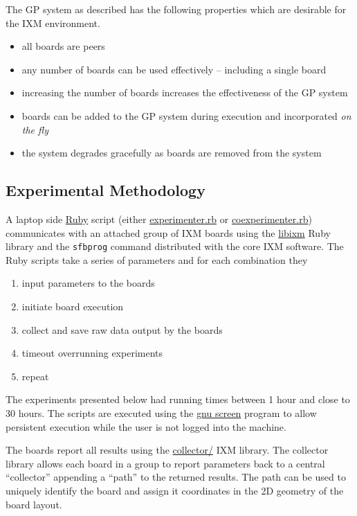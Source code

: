 \documentclass[11pt]{article}
\begin{document}
The GP system as described has the following properties which are
desirable for the IXM environment.
\begin{itemize}
\item all boards are peers
\item any number of boards can be used effectively -- including a single
  board
\item increasing the number of boards increases the effectiveness of the
  GP system
\item boards can be added to the GP system during execution and
  incorporated \emph{on the fly}
\item the system degrades gracefully as boards are removed from the system
\end{itemize}

\subsection*{Experimental Methodology}
\label{sec-1.4}

A laptop side \href{http://www.ruby-lang.org/en/}{Ruby} script (either \href{file:///nfs/adaptive/eschulte/src/gp4ixm-report/src/experimenter.rb}{experimenter.rb} or
\href{file:///nfs/adaptive/eschulte/src/gp4ixm-report/src/coexperimenter.rb}{coexperimenter.rb}) communicates with an attached group of IXM boards
using the \href{http://github.com/mixonic/libixm}{libixm} Ruby library and the \texttt{sfbprog} command distributed
with the core IXM software.  The Ruby scripts take a series of
parameters and for each combination they
\begin{enumerate}
\item input parameters to the boards
\item initiate board execution
\item collect and save raw data output by the boards
\item timeout overrunning experiments
\item repeat
\end{enumerate}

The experiments presented below had running times between 1 hour and
close to 30 hours.  The scripts are executed using the \href{http://www.gnu.org/software/screen/}{gnu screen}
program to allow persistent execution while the user is not logged
into the machine.

The boards report all results using the \href{file:///nfs/adaptive/eschulte/src/gp4ixm-report/src/collector/}{collector/} IXM library.  The
collector library allows each board in a group to report parameters
back to a central ``collector'' appending a ``path'' to the returned
results.  The path can be used to uniquely identify the board and
assign it coordinates in the 2D geometry of the board layout.
\end{document}
